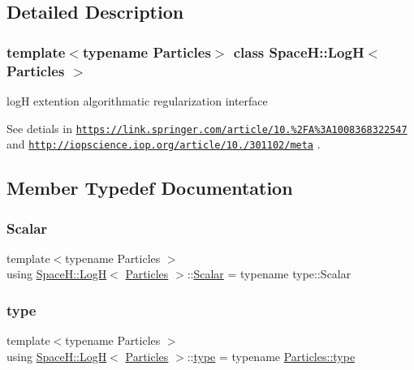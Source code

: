 \subsection{Detailed Description}
\subsubsection*{template$<$typename Particles$>$\newline
class Space\+H\+::\+Log\+H$<$ Particles $>$}

logH extention algorithmatic regularization interface 

See detials in \href{https://link.springer.com/article/10.1023%2FA%3A1008368322547}{\tt https\+://link.\+springer.\+com/article/10.\+1023\%2\+F\+A\%3\+A1008368322547} and \href{http://iopscience.iop.org/article/10.1086/301102/meta}{\tt http\+://iopscience.\+iop.\+org/article/10.\+1086/301102/meta} . 

\subsection{Member Typedef Documentation}
\mbox{\label{class_space_h_1_1_log_h_a930675187172d40c888b4b2c94f0bff5}} 
\subsubsection{\texorpdfstring{Scalar}{Scalar}}
{\footnotesize\ttfamily template$<$typename Particles $>$ \\
using \mbox{\hyperlink{class_space_h_1_1_log_h}{Space\+H\+::\+LogH}}$<$ \mbox{\hyperlink{struct_space_h_1_1_particles}{Particles}} $>$\+::\mbox{\hyperlink{class_space_h_1_1_log_h_a930675187172d40c888b4b2c94f0bff5}{Scalar}} =  typename type\+::\+Scalar}

\mbox{\label{class_space_h_1_1_log_h_a9d445f78b1c815836820de45771a6772}} 
\subsubsection{\texorpdfstring{type}{type}}
{\footnotesize\ttfamily template$<$typename Particles $>$ \\
using \mbox{\hyperlink{class_space_h_1_1_log_h}{Space\+H\+::\+LogH}}$<$ \mbox{\hyperlink{struct_space_h_1_1_particles}{Particles}} $>$\+::\mbox{\hyperlink{class_space_h_1_1_log_h_a9d445f78b1c815836820de45771a6772}{type}} =  typename \mbox{\hyperlink{class_space_h_1_1_vel_indep_particles_a09aa167b5fb1b203ab021220601ed74c}{Particles\+::type}}}



